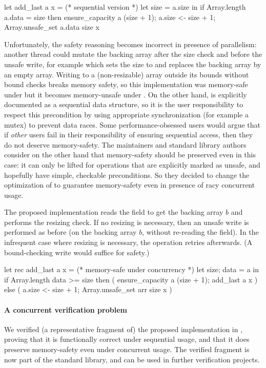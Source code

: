 \begin{ocamlcode}
let add_last a x = (* sequential version *)
  let size = a.size in
  if Array.length a.data = size then ensure_capacity a (size + 1);
  a.size <- size + 1;
  Array.unsafe_set a.data size x
\end{ocamlcode}

Unfortunately, the safety reasoning becomes incorrect in presence of parallelism: another thread could mutate the backing array after the size check and before the unsafe write, for example  which sets the size to  and replaces the backing array by an empty array.
Writing to a (non-resizable) array outside its bounds without bound checks breaks memory safety, so this implementation was memory-safe under \OCamlFour but it becomes memory-unsafe under \OCamlFive. On the other hand,  is explicitly documented as a sequential data structure, so it is the user responsibility to respect this precondition by using appropriate synchronization (for example a mutex) to prevent data races. Some performance-obsessed users would argue that if \emph{other} users fail in their responsibility of ensuring sequential access, then they do not deserve memory-safety. The \OCaml maintainers and standard library authors consider on the other hand that memory-safety should be preserved even in this case: it can only be lifted for operations that are explicitly marked as unsafe, and hopefully have simple, checkable preconditions. So they decided to change the optimization of  to guarantee memory-safety even in presence of racy concurrent usage.

The proposed implementation reads the  field to get the backing array $b$ and performs the resizing check. If no resizing is necessary, then an unsafe write is performed as before (on the backing array $b$, without re-reading the  field). In the infrequent case where resizing is necessary, the operation retries afterwards. (A bound-checking write would suffice for safety.)

\begin{ocamlcode}
let rec add_last a x = (* memory-safe under concurrency *)
  let {size; data} = a in
  if Array.length data >= size
  then ( ensure_capacity a (size + 1); add_last a x )
  else ( a.size <- size + 1; Array.unsafe_set arr size x )
\end{ocamlcode}

\paragraph{A concurrent verification problem} We verified (a representative fragment of) the proposed  implementation in \ZooLang, proving that it is functionally correct under sequential usage, and that it does preserve memory-safety even under concurrent usage. The verified fragment is now part of the \Zoo standard library, and can be used in further verification projects.

